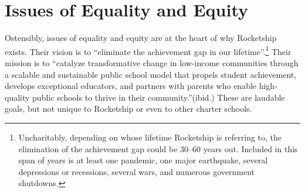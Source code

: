 \section{Issues of Equality and Equity}\indent%
\label{sec:issues_equality_equity}

Ostensibly, issues of equality and equity are at the heart of why Rocketship exists. Their vision is to ``eliminate the achievement gap in our lifetime''.\parencite{RSE2017}\footnote{Uncharitably, depending on whose lifetime Rocketship is referring to, the elimination of the achievement gap could be 30–60 years out. Included in this span of years is at least one pandemic, one major earthquake, several depressions or recessions, several wars, and numerous government shutdowns.} Their mission is to ``catalyze transformative change in low-income communities through a scalable and sustainable public school model that propels student achievement, develops exceptional educators, and partners with parents who enable high-quality public schools to thrive in their community.''(ibid.) These are laudable goals, but not unique to Rocketship or even to other charter schools.

